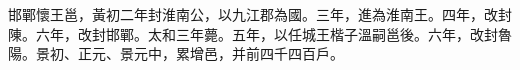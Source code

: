 
\begin{pinyinscope}
邯鄲懷王邕，黃初二年封淮南公，以九江郡為國。三年，進為淮南王。四年，改封陳。六年，改封邯鄲。太和三年薨。五年，以任城王楷子溫嗣邕後。六年，改封魯陽。景初、正元、景元中，累增邑，并前四千四百戶。


\end{pinyinscope}